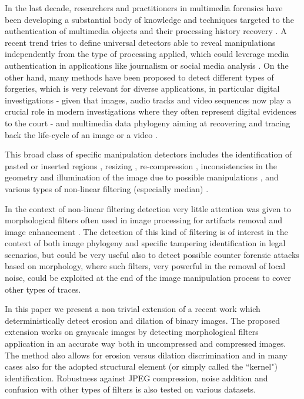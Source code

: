 \documentclass[review]{elsarticle}
\begin{document}
In the last decade, researchers and practitioners in multimedia forensics have been developing a substantial body of knowledge and techniques targeted to the authentication of multimedia objects and their processing history recovery \cite{stamm_overview, farid_book, ho, piva_overview, sencar_book}. 
A recent trend tries to define universal detectors able to reveal manipulations independently from the type of processing applied, which could leverage media authentication in applications like journalism or social media analysis \cite{noiseprint}. 
On the other hand, many methods have been proposed to detect different types of forgeries, which is very relevant for diverse applications, in particular digital investigations - given that images, audio tracks and video sequences now play a crucial role in modern investigations where they often represent digital evidences to the court \cite{forlab} - and multimedia data phylogeny aiming at recovering and tracing back the life-cycle of an image or a video \cite{Bestagini2016, Dias2012, Oliveira2016, Costa2014}.

This broad class of specific manipulation detectors includes the identification of pasted or inserted regions \cite{cm2, cm3, cm4, spl2, spl3}, resizing \cite{fernando2017}, re-compression \cite{PBPG2017-TIFS},  inconsistencies in the geometry and illumination of the image due to possible manipulations \cite{geom1, geom2, phys1}, and various types of non-linear filtering (especially median) \cite{Bahrami2015, Cao2014, Cao2011, Fridrich2010, Tian2010, Yuan:2011, Liu2013, Huang2013, Shi2014, Wang2015}. 

In the context of non-linear filtering detection 
very little attention was given to morphological filters \cite{haas1967morphologie} often used in image processing for artifacts removal and image enhancement \cite{British2012} \cite{Maragos2004}. The detection of this kind of filtering is of interest in the context of both image phylogeny and specific tampering identification in legal scenarios, but could be very useful also to detect possible counter forensic attacks based on morphology, where such filters, very powerful in the removal of local noise, could be exploited at the end of the image manipulation process to cover other types of traces. 

In this paper we present a non trivial extension of a recent work \cite{de2017detecting} which deterministically detect erosion and dilation of binary images. The proposed extension works on grayscale images by detecting morphological filters application in an accurate way both in uncompressed and compressed images. The method also allows for erosion versus dilation discrimination and in many cases also for the adopted structural element (or simply called the ``kernel") identification. 
Robustness against JPEG compression, noise addition and confusion with other types of filters is also tested on various datasets. 
\end{document}
